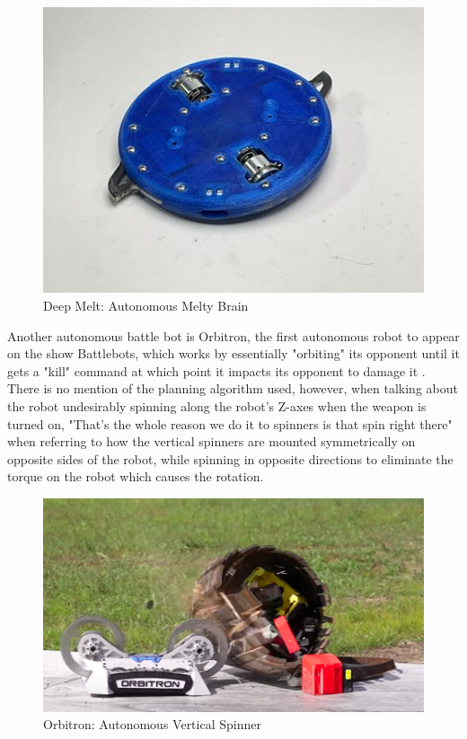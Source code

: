 \documentclass[conference]{IEEEtran}
\begin{document}
\begin{figure}[htp]
\centering
\includegraphics[scale=0.4]{deepmelt.jpg}
\caption{Deep Melt: Autonomous Melty Brain \cite{b2}}
\label{Deep Melt: Autonomous Melty Brain}
\end{figure}

Another autonomous battle bot is Orbitron, the first autonomous robot to appear on the show Battlebots, which works by essentially "orbiting" its opponent until it gets a "kill" command at which point it impacts its opponent to damage it \cite{b6}.  There is no mention of the planning algorithm used, however, when talking about the robot undesirably spinning along the robot's Z-axes when the weapon is turned on, "That's the whole reason we do it to spinners is that spin right there" \cite{b6} when referring to how the vertical spinners are mounted symmetrically on opposite sides of the robot, while spinning in opposite directions to eliminate the torque on the robot which causes the rotation.

\begin{figure}[htp]
\centering
\includegraphics[scale=0.25]{orbitron.png}
\caption{Orbitron: Autonomous Vertical Spinner \cite{b6}}
\label{Orbitron: Autonomous Vertical Spinner}
\end{figure}
\end{document}
